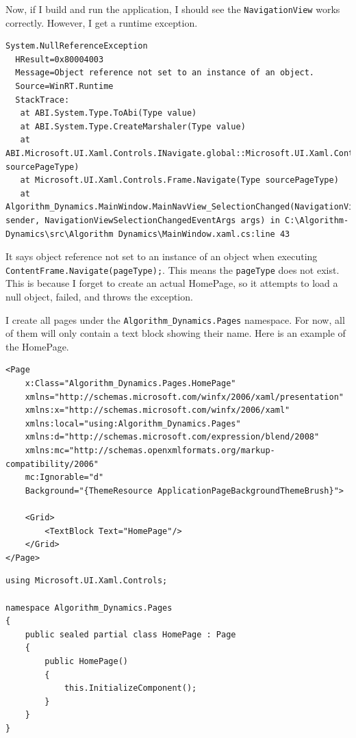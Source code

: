 \documentclass[a4paper]{report}
\begin{document}
Now, if I build and run the application, I should see the \verb|NavigationView| works correctly. However, I get a runtime exception.

\begin{verbatim}
System.NullReferenceException
  HResult=0x80004003
  Message=Object reference not set to an instance of an object.
  Source=WinRT.Runtime
  StackTrace:
   at ABI.System.Type.ToAbi(Type value)
   at ABI.System.Type.CreateMarshaler(Type value)
   at ABI.Microsoft.UI.Xaml.Controls.INavigate.global::Microsoft.UI.Xaml.Controls.INavigate.Navigate(Type sourcePageType)
   at Microsoft.UI.Xaml.Controls.Frame.Navigate(Type sourcePageType)
   at Algorithm_Dynamics.MainWindow.MainNavView_SelectionChanged(NavigationView sender, NavigationViewSelectionChangedEventArgs args) in C:\Algorithm-Dynamics\src\Algorithm Dynamics\MainWindow.xaml.cs:line 43
\end{verbatim}


It says object reference not set to an instance of an object when executing \verb|ContentFrame.Navigate(pageType);|. This means the \verb|pageType| does not exist. This is because I forget to create an actual HomePage, so it attempts to load a null object, failed, and throws the exception.  

I create all pages under the \verb|Algorithm_Dynamics.Pages| namespace. For now, all of them will only contain a text block showing their name. Here is an example of the HomePage.

\begin{verbatim}
<Page
    x:Class="Algorithm_Dynamics.Pages.HomePage"
    xmlns="http://schemas.microsoft.com/winfx/2006/xaml/presentation"
    xmlns:x="http://schemas.microsoft.com/winfx/2006/xaml"
    xmlns:local="using:Algorithm_Dynamics.Pages"
    xmlns:d="http://schemas.microsoft.com/expression/blend/2008"
    xmlns:mc="http://schemas.openxmlformats.org/markup-compatibility/2006"
    mc:Ignorable="d"
    Background="{ThemeResource ApplicationPageBackgroundThemeBrush}">

    <Grid>
        <TextBlock Text="HomePage"/>
    </Grid>
</Page>
\end{verbatim}


\begin{verbatim}
using Microsoft.UI.Xaml.Controls;

namespace Algorithm_Dynamics.Pages
{
    public sealed partial class HomePage : Page
    {
        public HomePage()
        {
            this.InitializeComponent();
        }
    }
}
\end{verbatim}
\end{document}
